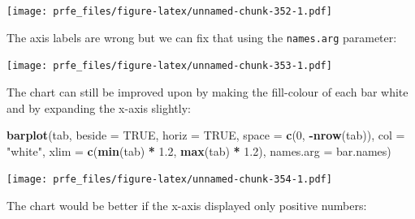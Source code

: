 \documentclass[12pt,a4paper]{book}
\newenvironment{Shaded}{\begin{snugshade}}{\end{snugshade}}
\newcommand{\KeywordTok}[1]{\textcolor[rgb]{0.13,0.29,0.53}{\textbf{#1}}}
\newcommand{\DataTypeTok}[1]{\textcolor[rgb]{0.13,0.29,0.53}{#1}}
\newcommand{\DecValTok}[1]{\textcolor[rgb]{0.00,0.00,0.81}{#1}}
\newcommand{\FloatTok}[1]{\textcolor[rgb]{0.00,0.00,0.81}{#1}}
\newcommand{\StringTok}[1]{\textcolor[rgb]{0.31,0.60,0.02}{#1}}
\newcommand{\OtherTok}[1]{\textcolor[rgb]{0.56,0.35,0.01}{#1}}
\newcommand{\OperatorTok}[1]{\textcolor[rgb]{0.81,0.36,0.00}{\textbf{#1}}}
\newcommand{\NormalTok}[1]{#1}
\theoremstyle{definition}
\theoremstyle{definition}
\theoremstyle{definition}
\theoremstyle{remark}
\begin{document}
\texttt{[image: prfe\_files/figure-latex/unnamed-chunk-352-1.pdf]}

The axis labels are wrong but we can fix that using the
\texttt{names.arg} parameter:

\begin{Shaded}
\end{Shaded}

\texttt{[image: prfe\_files/figure-latex/unnamed-chunk-353-1.pdf]}

The chart can still be improved upon by making the fill-colour of each
bar white and by expanding the x-axis slightly:

\begin{Shaded}
\begin{Highlighting}[]
\KeywordTok{barplot}\NormalTok{(tab, }\DataTypeTok{beside =} \OtherTok{TRUE}\NormalTok{, }\DataTypeTok{horiz =} \OtherTok{TRUE}\NormalTok{, }\DataTypeTok{space =} \KeywordTok{c}\NormalTok{(}\DecValTok{0}\NormalTok{, }\OperatorTok{-}\KeywordTok{nrow}\NormalTok{(tab)),}
        \DataTypeTok{col =} \StringTok{"white"}\NormalTok{, }\DataTypeTok{xlim =} \KeywordTok{c}\NormalTok{(}\KeywordTok{min}\NormalTok{(tab) }\OperatorTok{*}\StringTok{ }\FloatTok{1.2}\NormalTok{, }\KeywordTok{max}\NormalTok{(tab) }\OperatorTok{*}\StringTok{ }\FloatTok{1.2}\NormalTok{),}
        \DataTypeTok{names.arg =}\NormalTok{ bar.names)}
\end{Highlighting}
\end{Shaded}

\texttt{[image: prfe\_files/figure-latex/unnamed-chunk-354-1.pdf]}

The chart would be better if the x-axis displayed only positive numbers:
\end{document}
